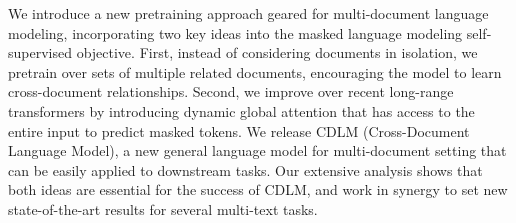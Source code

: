 We introduce a new pretraining approach geared for multi-document language modeling, incorporating two key ideas into the masked language modeling self-supervised objective. First, instead of considering documents in isolation, we pretrain over sets of multiple related documents, encouraging the model to learn cross-document relationships. Second, we improve over recent long-range transformers by introducing dynamic global attention that has access to the entire input to predict masked tokens. We release CDLM (Cross-Document Language Model), a new general language model for multi-document setting that can be easily applied to downstream tasks. Our extensive analysis shows that both ideas are essential for the success of CDLM, and work in synergy to set new state-of-the-art results for several multi-text tasks.
